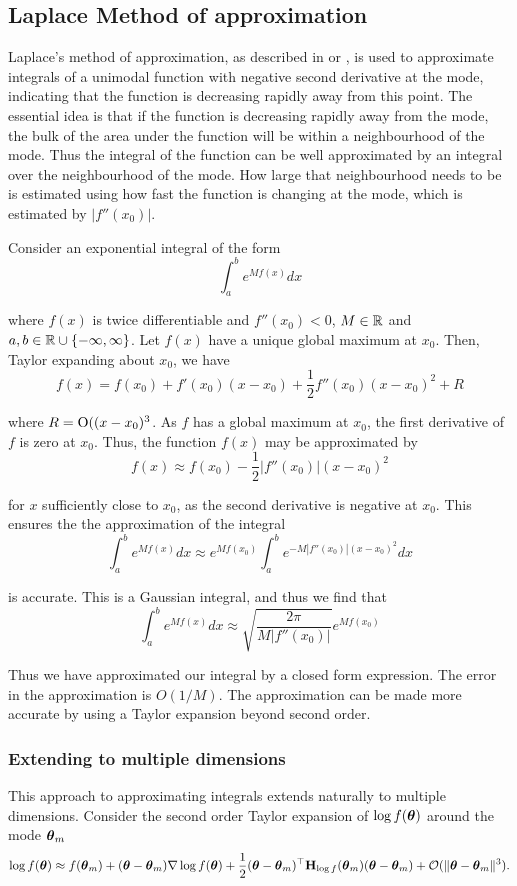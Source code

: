 \subsection{Laplace Method of approximation}
\label{sec:laplace_approximation}
Laplace's method of approximation, as described in \cite{butler_2007} or \cite{MacKay:2002:ITI:971143}, is
used to approximate integrals of a unimodal function with negative second derivative at the mode, indicating
that the function is decreasing rapidly away from this point. The essential idea is that if the function is
decreasing rapidly away from the mode, the bulk of the area under the function will be within a neighbourhood
of the mode. Thus the integral of the function can be well approximated by an integral over the neighbourhood
of the mode. How large that neighbourhood needs to be is estimated using how fast the function is changing at
the mode, which is estimated by $|f''(x_0)|$.

Consider an exponential integral of the form
$$
	\int_a^b e^{M f(x)} dx
$$

\noindent where $f(x)$ is twice differentiable and $f''(x_0) < 0$, $M \in {\mathbb{R}}$ and $a, b \in {\mathbb{R}} \cup \{-\infty,
\infty\}$. Let $f(x)$ have a unique global maximum at $x_0$. Then, Taylor expanding about $x_0$, we have
$$
	f(x) = f(x_0) + f'(x_0) (x - x_0) + \frac{1}{2} f''(x_0) (x - x_0)^2 + R
$$

\noindent where $R = \text{O}((x - x_0)^3$. As $f$ has a global maximum at $x_0$, the first derivative of $f$ is
zero at $x_0$. Thus, the function $f(x)$ may be approximated by
$$
	f(x) \approx f(x_0) - \frac{1}{2} |f''(x_0)| (x - x_0)^2
$$

\noindent for $x$ sufficiently close to $x_0$, as the second derivative is negative at $x_0$. This ensures the
the approximation of the integral
$$
	\int_a^b e^{M f(x)} dx \approx e^{M f(x_0)} \int_a^b e^{-M |f''(x_0)|(x - x_0)^2} dx
$$

\noindent is accurate. This is a Gaussian integral, and thus we find that
$$
	\int_a^b e^{M f(x)} dx \approx \sqrt{\frac{2 \pi}{M |f''(x_0)|}} e^{M f(x_0)}
$$

\noindent Thus we have approximated our integral by a closed form expression. The error in the approximation
is $O(1/M)$. The approximation can be made more accurate by using a Taylor expansion beyond second order.

\subsubsection{Extending to multiple dimensions}
This approach to approximating integrals extends naturally to multiple dimensions.
Consider the second order Taylor expansion of $\log f({\boldsymbol \theta})$ around the mode ${\boldsymbol \theta}_m$
$$
\log f({\boldsymbol \theta}) \approx f({\boldsymbol \theta}_m) + ({\boldsymbol \theta} - {\boldsymbol \theta}_m) \nabla \log f({\boldsymbol \theta}) + \frac{1}{2} ({\boldsymbol \theta} - {\boldsymbol \theta}_m)^\top {\bf H}_{\log f}({\boldsymbol \theta}_m) ({\boldsymbol \theta} - {\boldsymbol \theta}_m) + {\mathcal O}(\|{\boldsymbol \theta} - {\boldsymbol \theta}_m\|^3).
$$

